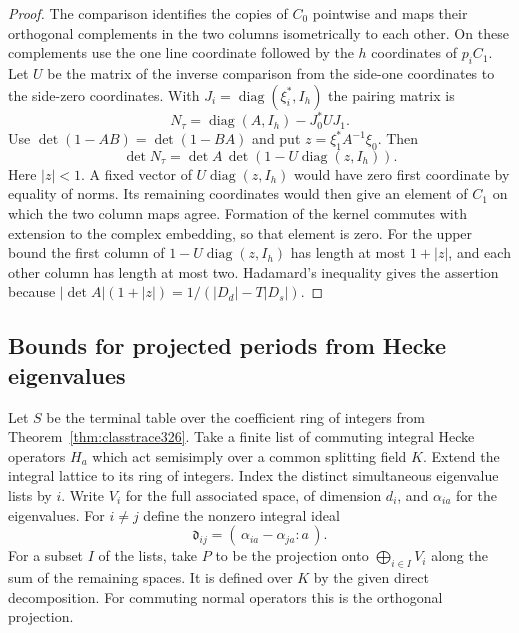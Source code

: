 \documentclass[a4paper,11pt]{article}
\theoremstyle{definition}
\theoremstyle{remark}
\numberwithin{equation}{section}
\begin{document}
\begin{proof}
The comparison identifies the copies of \(C_0\) pointwise
and maps their orthogonal complements in the two columns
isometrically to each other. On these complements use the
one line coordinate followed by the \(h\) coordinates of
\(p_i C_1\). Let \(U\) be the matrix of the inverse
comparison from the side-one coordinates to the side-zero
coordinates. With \(J_i=\operatorname{diag}(\xi_i^*,I_h)\)
the pairing matrix is
\[
        N_\tau=\operatorname{diag}(A,I_h)-J_0^*U J_1 .
\]
Use \(\det(1-AB)=\det(1-BA)\) and put \(z=\xi_1^*A^{-1}\xi_0\).
Then
\[
      \det N_\tau=\det A\,\det(1-U\operatorname{diag}(z,I_h)).
\]
Here \(|z|<1\). A fixed vector of
\(U\operatorname{diag}(z,I_h)\) would have zero first
coordinate by equality of norms. Its remaining coordinates
would then give an element of \(C_1\) on which the two
column maps agree. Formation of the kernel commutes with
extension to the complex embedding, so that element is zero.
For the upper bound the first column of
\(1-U\operatorname{diag}(z,I_h)\) has length at most
\(1+|z|\), and each other column has length at most two.
Hadamard's inequality gives the assertion because
\(|\det A|(1+|z|)=1/(|D_d|-T|D_s|)\).
\end{proof}

\subsection{Bounds for projected periods from Hecke eigenvalues}\label{nav:III-75}
Let \(S\) be the terminal table over the coefficient ring
of integers from Theorem~\ref{thm:classtrace326}. Take a
finite list of commuting integral Hecke operators \(H_a\)
which act semisimply over a common splitting field \(K\).
Extend the integral lattice to its ring of integers.
Index the distinct simultaneous eigenvalue lists by \(i\).
Write \(V_i\) for the full associated space, of dimension
\(d_i\), and \(\alpha_{ia}\) for the eigenvalues. For
\(i\ne j\) define the nonzero integral ideal
\[
             \mathfrak d_{ij}=(\,\alpha_{ia}-\alpha_{ja}:a\,).
\]
For a subset \(I\) of the lists, take \(P\) to be the
projection onto \(\bigoplus_{i\in I}V_i\) along the sum
of the remaining spaces. It is defined over \(K\) by the
given direct decomposition. For commuting normal operators
this is the orthogonal projection.
\end{document}
